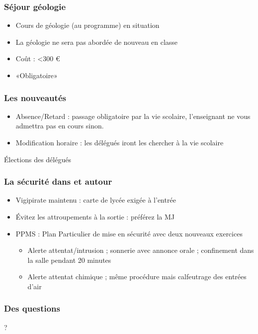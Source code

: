 \documentclass[frenchb]{beamer}
\begin{document}
\begin{frame}
  \frametitle{Séjour géologie}
  \begin{itemize}[<+->]
    \item Cours de géologie (au programme) en situation
    \item La géologie ne sera pas abordée de nouveau en classe
    \item Coût : <300 €
    \item «Obligatoire»
  \end{itemize}
\end{frame}

\begin{frame}
  \frametitle{Les nouveautés}
  \begin{itemize}[<+->]
    \item Absence/Retard : passage obligatoire par la vie scolaire,
      l'enseignant ne vous admettra pas en cours sinon.
    \item Modification horaire : les délégués iront les chercher à la
      vie scolaire
  \end{itemize}
\end{frame}

\begin{frame}
  \begin{center}
    \LARGE Élections des délégués \normalsize
  \end{center}
\end{frame}

\begin{frame}
  \frametitle{La sécurité dans et autour}
  \begin{itemize}[<+->]
    \item Vigipirate maintenu : carte de lycée exigée à l'entrée
    \item Évitez les attroupements à la sortie : préférez la MJ
    \item PPMS : Plan Particulier de mise en sécurité avec deux nouveaux
      exercices
      \begin{itemize}
        \item Alerte attentat/intrusion ; sonnerie avec annonce orale ;
          confinement dans la salle pendant 20 minutes
        \item Alerte attentat chimique ; même procédure mais calfeutrage
          des entrées d'air
      \end{itemize}
  \end{itemize}
\end{frame}

\begin{frame}
  \frametitle{Des questions}
  \begin{center}
    \Huge ? \normalsize
  \end{center}
\end{frame}
\end{document}
